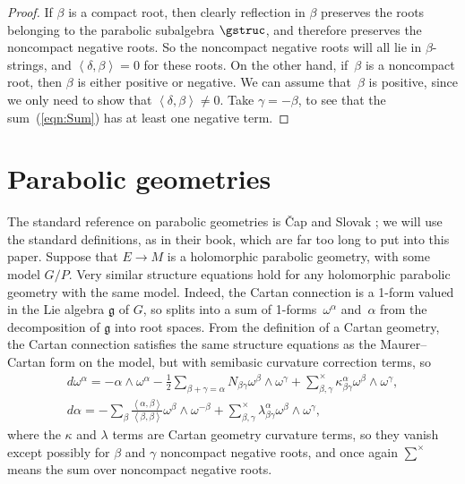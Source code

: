 \begin{proof}
If $\beta$ is a compact root, then clearly ref\/lection in
$\beta$ preserves the roots belonging to the parabolic subalgebra
$\gstruc$, and therefore preserves the noncompact negative roots.
So the noncompact negative roots will all lie in $\beta$-strings, and
$\left<\delta,\beta\right>=0$ for these roots. On the other hand, if~$\beta$ is a noncompact root, then $\beta$
is either positive or negative. We can assume that~$\beta$ is positive, since we only need to show that $\left<\delta,\beta\right> \ne 0$. Take
$\gamma=-\beta$, to see that the sum~(\ref{eqn:Sum}) has at least
one negative term.
\end{proof}

\section{Parabolic geometries}

The standard reference on parabolic
geometries is \v{C}ap and Slovak \cite{Cap/Slovak:2009};
we will use the standard def\/initions, as in their
book, which are far too long to put into this paper.
Suppose that $E \to M$ is a holomorphic
parabolic geometry, with some model $G/P$.
Very similar structure equations hold for any
holomorphic parabolic geometry with the same model. Indeed,
the Cartan connection is a 1-form valued in the Lie
algebra $\mathfrak{g}$ of $G$, so splits into a sum
of 1-forms~$\omega^{\alpha}$ and~$\alpha$ from the
decomposition of $\mathfrak{g}$ into root spaces.
From the def\/inition of a Cartan geometry, the
Cartan connection satisf\/ies the same structure
equations as the Maurer--Cartan form on the model,
but with semibasic curvature correction terms, so
\begin{gather*}
d \omega^{\alpha}  = - \alpha \wedge \omega^{\alpha} - \frac{1}{2}
\sum_{\beta + \gamma=\alpha} N_{\beta \gamma} \omega^{\beta} \wedge \omega^{\gamma}
+
\sum^{\times}_{\beta, \gamma}
\kappa^{\alpha}_{\beta \gamma} \omega^{\beta} \wedge \omega^{\gamma},
\\
d \alpha  =
-
\sum_{\beta} \frac{\left<\alpha,\beta\right>}
{\left<\beta,\beta\right>} \omega^{\beta} \wedge \omega^{-\beta}
+
\sum^{\times}_{\beta, \gamma}
\lambda^{\alpha}_{\beta \gamma} \omega^{\beta} \wedge \omega^{\gamma},
\end{gather*}
where the $\kappa$ and $\lambda$ terms are Cartan geometry
curvature terms, so they vanish except possibly for
$\beta$ and $\gamma$ noncompact negative roots, and
once again $\displaystyle{\sum^{\times}}$ means
the sum over noncompact negative roots.

